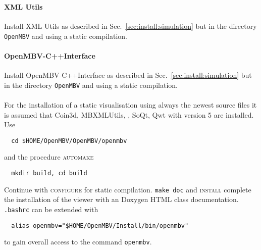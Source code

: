 \subsubsection{\OpenMBV{}}
\paragraph{XML Utils}
Install XML Utils as described in Sec.~\ref{sec:install:simulation} but in the directory \texttt{OpenMBV} and using a static compilation.

\paragraph{OpenMBV-C++Interface}
Install OpenMBV-C++Interface as described in Sec.~\ref{sec:install:simulation} but in the directory \texttt{OpenMBV} and using a static compilation.

\paragraph{\OpenMBV{}}
For the installation of a static visualisation using always the newest source files it is assumed that Coin3d, MBXMLUtils, \HDFSerie, SoQt, Qwt with version 5 are installed. Use
\begin{verbatim}
  cd $HOME/OpenMBV/OpenMBV/openmbv
\end{verbatim} 
and the procedure \textsc{automake}
\begin{verbatim}
  mkdir build, cd build
\end{verbatim}
Continue with \textsc{configure} for static compilation. \texttt{make doc} and \textsc{install} complete the installation of the viewer with an Doxygen HTML class documentation. \texttt{.bashrc} can be extended with
\begin{verbatim}
  alias openmbv="$HOME/OpenMBV/Install/bin/openmbv"
\end{verbatim}
to gain overall access to the command \texttt{openmbv}.
